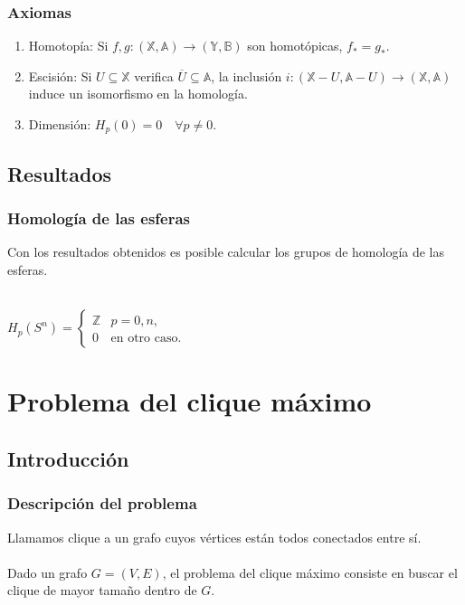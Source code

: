 \documentclass{beamer}
\def\X{{\mathbb X}}
\def\A{{\mathbb A}}
\def\Y{{\mathbb Y}}
\def\B{{\mathbb B}}
\newcounter{saveenumi}
\newcommand{\seti}{\setcounter{saveenumi}{\value{enumi}}}
\newcommand{\conti}{\setcounter{enumi}{\value{saveenumi}}}
\begin{document}
\begin{frame}
  \frametitle{Axiomas}
  \begin{enumerate}
    \conti
      \item Homotopía: Si $f, g \colon (\X, \A) \to (\Y, \B)$ son homotópicas, $f_* = g_*$.
      \item Escisión: Si $U \subseteq \X$ verifica $\overline{U} \subseteq \A$, la inclusión $i \colon (\X - U, \A - U) \to (\X, \A)$
            induce un isomorfismo en la homología.
      \item Dimensión: $H_p(0) = 0 \quad \forall p \neq 0.$

    \seti
  \end{enumerate}
\end{frame}


\subsection{Resultados}

\begin{frame}
  \frametitle{Homología de las esferas}
  Con los resultados obtenidos es posible calcular los grupos de homología de las esferas. \\~\\

  \centerline{$H_p(S^n) = \begin{cases} \mathbb Z & p = 0, n,\\
                                                0 & \text{en otro caso.} \end{cases}$}
\end{frame}


\section{Problema del clique máximo}

\subsection{Introducción}

\begin{frame}
\frametitle{Descripción del problema}
Llamamos clique a un grafo cuyos vértices están todos conectados entre sí. \\~\\

Dado un grafo $G = (V, E)$, el problema del clique máximo consiste en buscar el clique de mayor
tamaño dentro de $G$. \\~\\

\end{frame}
\end{document}
